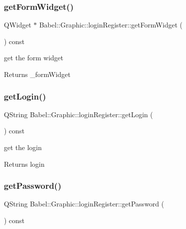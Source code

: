 \subsubsection{\texorpdfstring{get\+Form\+Widget()}{getFormWidget()}}
{\footnotesize\ttfamily Q\+Widget $\ast$ Babel\+::\+Graphic\+::login\+Register\+::get\+Form\+Widget (\begin{DoxyParamCaption}{ }\end{DoxyParamCaption}) const}

get the form widget \begin{DoxyReturn}{Returns}
\+\_\+form\+Widget 
\end{DoxyReturn}
\mbox{\label{classBabel_1_1Graphic_1_1loginRegister_a278b0a1b27fd0c5641365a2041e5b9a8}} 
\subsubsection{\texorpdfstring{get\+Login()}{getLogin()}}
{\footnotesize\ttfamily Q\+String Babel\+::\+Graphic\+::login\+Register\+::get\+Login (\begin{DoxyParamCaption}{ }\end{DoxyParamCaption}) const}

get the login \begin{DoxyReturn}{Returns}
login 
\end{DoxyReturn}
\mbox{\label{classBabel_1_1Graphic_1_1loginRegister_ac7c9aa3796da325676beb649139c57ad}} 
\subsubsection{\texorpdfstring{get\+Password()}{getPassword()}}
{\footnotesize\ttfamily Q\+String Babel\+::\+Graphic\+::login\+Register\+::get\+Password (\begin{DoxyParamCaption}{ }\end{DoxyParamCaption}) const}

